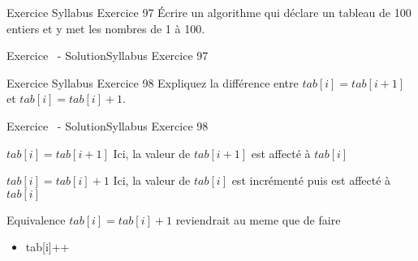 \begin{frame}{Exercice \theexercice}{Syllabus Exercice 97}
    Écrire un algorithme qui déclare un tableau de 100 entiers
    et y met les nombres de 1 à 100.
\end{frame}

\begin{frame}{Exercice \theexercice~- Solution}{Syllabus Exercice 97}
    
\end{frame}

\begin{frame}{Exercice \theexercice}{Syllabus Exercice 98}
    Expliquez la différence entre $tab[i] = tab[i+1]$
    et $tab[i] = tab[i]+1$.
\end{frame}

\begin{frame}{Exercice \theexercice~- Solution}{Syllabus Exercice 98}
    \begin{block}{\textbf{$tab[i] = tab[i+1]$}}
        Ici, la valeur de $tab[i+1]$ est affecté à $tab[i]$
    \end{block}

    \begin{block}{\textbf{$tab[i] = tab[i]+1$}}
        Ici, la valeur de $tab[i]$ est incrémenté puis est affecté à $tab[i]$
    \end{block}

    \begin{exampleblock}{Equivalence}
        $tab[i] = tab[i]+1$ reviendrait au meme que de faire
        \begin{itemize}
            \item tab[i]++
        \end{itemize}
    \end{exampleblock}
\end{frame}

